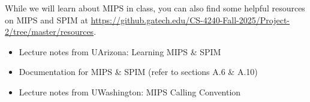 \documentclass[12pt]{article}
\begin{document}

While we will learn about MIPS in class, you can also find some helpful resources on MIPS and SPIM at \url{https://github.gatech.edu/CS-4240-Fall-2025/Project-2/tree/master/resources}.
\begin{itemize}
    \item Lecture notes from UArizona: Learning MIPS \& SPIM
    \item Documentation for MIPS \& SPIM (refer to sections A.6 \& A.10)
    \item Lecture notes from UWashington: MIPS Calling Convention
\end{itemize}


\end{document}
